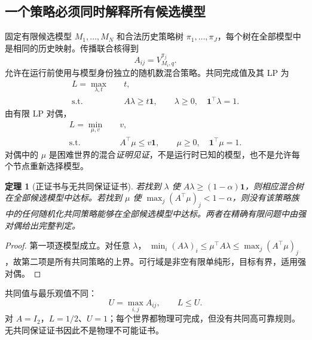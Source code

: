 \documentclass[11pt,a4paper,fontset=fandol]{ctexart}
\newtheorem{theorem}{定理}[section]
\theoremstyle{definition}
\theoremstyle{remark}\newtheorem{remark}[theorem]{说明}
\numberwithin{equation}{section}
\begin{document}
\subsection{一个策略必须同时解释所有候选模型}
固定有限候选模型 $M_1,\ldots,M_N$ 和合法历史策略树 $\pi_1,\ldots,\pi_J$，每个树在全部模型中是相同的历史映射。传播联合核得到
\begin{equation}
 A_{ij}=V_{M_i,q}^{\pi_j}.
\end{equation}
允许在运行前使用与模型身份独立的随机数混合策略。共同完成值及其 LP 为
\begin{align}
 L=\max_{\lambda,t}\quad&t,\nonumber\\
 \text{s.t.}\quad&A\lambda\ge t\mathbf1,\qquad
 \lambda\ge0,\quad\mathbf1^\top\lambda=1.
 \label{eq:lp_primal}
\end{align}
由有限 LP 对偶，
\begin{align}
 L=\min_{\mu,v}\quad&v,\nonumber\\
 \text{s.t.}\quad&A^\top\mu\le v\mathbf1,\qquad
 \mu\ge0,\quad\mathbf1^\top\mu=1.
 \label{eq:lp_dual}
\end{align}
对偶中的 $\mu$ 是困难世界的混合\emph{证明见证}，不是运行时已知的模型，也不是允许每个节点重新选择模型。

\begin{theorem}[正证书与无共同保证证书]
\label{thm:dual}
若找到 $\lambda$ 使 $A\lambda\ge(1-\alpha)\mathbf1$，则相应混合树在全部候选模型中达标。若找到 $\mu$ 使 $\max_j(A^\top\mu)_j<1-\alpha$，则没有该策略族中的任何随机化共同策略能够在全部候选模型中达标。两者在精确有限问题中由强对偶给出完整判定。
\end{theorem}
\begin{proof}
第一项逐模型成立。对任意 $\lambda$，
$\min_i(A\lambda)_i\le\mu^\top A\lambda\le\max_j(A^\top\mu)_j$，故第二项是所有共同策略的上界。可行域是非空有限单纯形，目标有界，适用强对偶。
\end{proof}

共同值与最乐观值不同：
\begin{equation}
 U=\max_{i,j}A_{ij},\qquad L\le U.
 \label{eq:optimistic}
\end{equation}
对 $A=I_2$，$L=1/2$、$U=1$；每个世界都物理可完成，但没有共同高可靠规则。无共同保证证书因此不是物理不可能证书。
\end{document}
